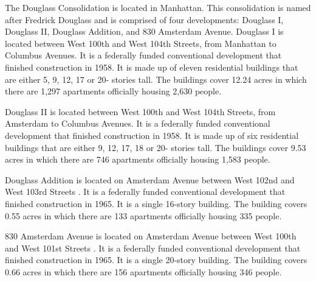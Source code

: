     

  

The Douglass Consolidation is located in Manhattan. This consolidation is named after Fredrick Douglass and is comprised of four developments: Douglass I, Douglass II, Douglass Addition, and 830 Amsterdam Avenue. Douglass I is located between West 100th and West 104th Streets, from Manhattan to Columbus Avenues. It is a federally funded conventional development that finished construction in 1958. It is made up of eleven residential buildings that are either 5, 9, 12, 17 or 20- stories tall. The buildings cover 12.24 acres in which there are 1,297 apartments officially housing 2,630 people.     

Douglass II is located between West 100th and West 104th Streets, from Amsterdam to Columbus Avenues. It is a federally funded conventional development that finished construction in 1958. It is made up of six residential buildings that are either 9, 12, 17, 18 or 20- stories tall. The buildings cover 9.53 acres in which there are 746 apartments officially housing 1,583 people.     

    

Douglass Addition is located on Amsterdam Avenue between West 102nd and West 103rd Streets . It is a federally funded conventional development that finished construction in 1965. It is a single 16-story building. The building covers 0.55 acres in which there are 133 apartments officially housing 335 people.     

 

830 Amsterdam Avenue is located on Amsterdam Avenue between West 100th and West 101st Streets . It is a federally funded conventional development that finished construction in 1965. It is a single 20-story building. The building covers 0.66 acres in which there are 156 apartments officially housing 346 people.     

      

 